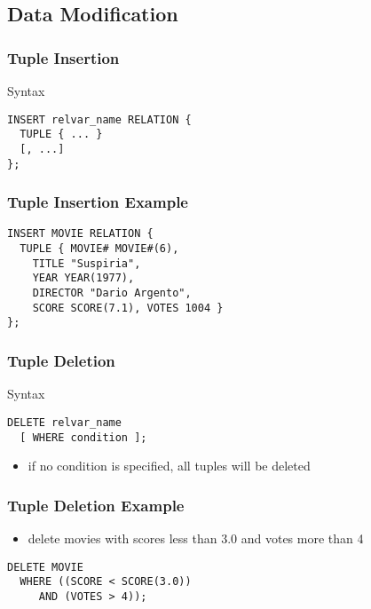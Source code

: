 \documentclass[dvipsnames]{beamer}
\theoremstyle{plain}
\begin{document}
\subsection{Data Modification}

\begin{frame}[fragile]
  \frametitle{Tuple Insertion}

  \begin{block}{Syntax}
    \begin{lstlisting}
INSERT relvar_name RELATION {
  TUPLE { ... }
  [, ...]
};
    \end{lstlisting}
  \end{block}
\end{frame}

\begin{frame}[fragile]
  \frametitle{Tuple Insertion Example}

  \begin{example}
    \begin{lstlisting}
INSERT MOVIE RELATION {
  TUPLE { MOVIE# MOVIE#(6),
    TITLE "Suspiria",
    YEAR YEAR(1977),
    DIRECTOR "Dario Argento",
    SCORE SCORE(7.1), VOTES 1004 }
};
    \end{lstlisting}
  \end{example}
\end{frame}

\begin{frame}[fragile]
  \frametitle{Tuple Deletion}

  \begin{block}{Syntax}
    \begin{lstlisting}
DELETE relvar_name
  [ WHERE condition ];
    \end{lstlisting}
  \end{block}

  \begin{itemize}
    \item if no condition is specified, all tuples will be deleted
  \end{itemize}
\end{frame}

\begin{frame}[fragile]
  \frametitle{Tuple Deletion Example}

  \begin{example}
    \begin{itemize}
      \item delete movies with scores less than 3.0 and votes more than 4
    \end{itemize}

    \begin{lstlisting}
DELETE MOVIE
  WHERE ((SCORE < SCORE(3.0))
     AND (VOTES > 4));
    \end{lstlisting}
  \end{example}
\end{frame}
\end{document}
